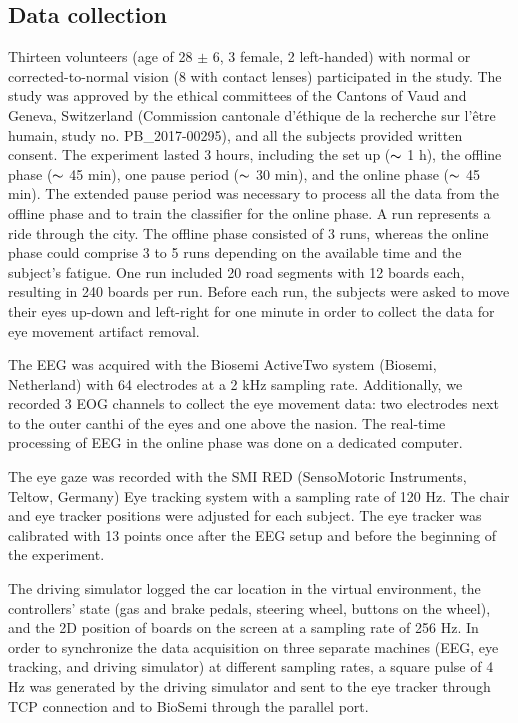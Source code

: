 \documentclass[12pt]{iopart}
\begin{document}
\subsection{Data collection}

Thirteen volunteers (age of 28 $\pm$ 6, 3 female, 2 left-handed) with normal or
corrected-to-normal vision (8 with contact lenses) participated in the study.
The study was approved by the ethical committees of the 
Cantons of Vaud and Geneva, Switzerland (Commission cantonale
d'\'ethique de la recherche sur l'\^etre humain, study no. PB\_2017-00295),
and all the subjects provided written consent.
The experiment lasted 3 hours, including the set up ($\thicksim$ 1 h), the offline phase ($\thicksim$ 45 min),
one pause period ($\thicksim$ 30 min), and the online phase ($\thicksim$ 45 min).
The extended pause period was necessary to process all the data
from the offline phase and to train the classifier for the online phase.
A run represents a ride through the city. The offline phase consisted of 3 runs, whereas the online
phase could comprise 3 to 5 runs depending on the available time
and the subject's fatigue.
One run included 20 road segments with 12 boards each, resulting in 240 boards per run.
Before each run, the subjects were asked to move their eyes up-down and left-right
for one minute in order to collect the data for eye movement artifact removal.

The EEG was acquired with the Biosemi ActiveTwo system (Biosemi, Netherland) with 64 electrodes at a 2 kHz sampling rate.
Additionally, we recorded 3 EOG channels to collect the eye movement data:
two electrodes next to the outer canthi of the eyes and one above the nasion.
The real-time processing
of EEG in the online phase was done on a dedicated computer.

The eye gaze was recorded with the SMI RED (SensoMotoric Instruments, Teltow, Germany) Eye tracking system 
with a sampling rate of 120 Hz.
The chair and eye tracker positions were adjusted for each subject.
The eye tracker
was calibrated with 13 points once after the EEG setup and before the beginning of 
the experiment.

The driving simulator logged the car location in the virtual environment,
the controllers' state (gas and brake pedals, steering wheel,
buttons on the wheel),
and the 2D position of boards on the screen at a sampling rate
of 256 Hz. In order to synchronize the data acquisition on three separate machines
(EEG, eye tracking, and driving simulator) at different sampling rates,
a square pulse of 4 Hz was generated by the driving simulator and sent 
to the eye tracker through TCP connection and to BioSemi through the parallel port.
\end{document}
